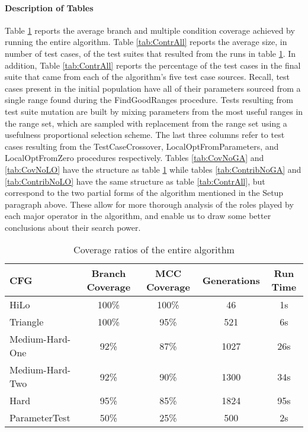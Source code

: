 \documentclass[runningheads]{llncs}
\begin{document}
\paragraph{Description of Tables} Table \ref{tab:CovAll} reports the average branch and multiple condition coverage achieved by running the entire algorithm. Table \ref{tab:ContrAll} reports the average size, in number of test cases, of the test suites that resulted from the runs in table \ref{tab:CovAll}. In addition, Table \ref{tab:ContrAll} reports the percentage of the test cases in the final suite that came from each of the algorithm's five test case sources. Recall, test cases present in the initial population have all of their parameters sourced from a single range found during the FindGoodRanges procedure. Tests resulting from test suite mutation are built by mixing parameters from the most useful ranges in the range set, which are sampled with replacement from the range set using a usefulness proportional selection scheme. The last three columns refer to test cases resulting from the TestCaseCrossover, LocalOptFromParameters, and LocalOptFromZero procedures respectively. Tables \ref{tab:CovNoGA} and \ref{tab:CovNoLO} have the structure as table \ref{tab:CovAll} while tables \ref{tab:ContribNoGA} and \ref{tab:ContribNoLO} have the same structure as table \ref{tab:ContrAll}, but correspond to the two partial forms of the algorithm mentioned in the Setup paragraph above. These allow for more thorough analysis of the roles played by each major operator in the algorithm, and enable us to draw some better conclusions about their search power.

\begin{table}[h!]
	\begin{center}
		\begin{tabular}{| l | c | c | c | c |}
			\hline
			CFG             & Branch Coverage & MCC Coverage & Generations & Run Time \\ \hline
			HiLo            & 100\%           & 100\%        & 46          & 1s       \\ \hline
			Triangle        & 100\%           & 95\%         & 521         & 6s       \\ \hline
			Medium-Hard-One & 92\%            & 87\%         & 1027        & 26s      \\ \hline
			Medium-Hard-Two & 92\%            & 90\%         & 1300        & 34s      \\ \hline
			Hard            & 95\%            & 85\%         & 1824        & 95s      \\ \hline
			ParameterTest   & 50\%            & 25\%         & 500         & 2s       \\ \hline
		\end{tabular}
	\end{center}
	\caption{Coverage ratios of the entire algorithm}  
	\label{tab:CovAll}
\end{table}
\end{document}
